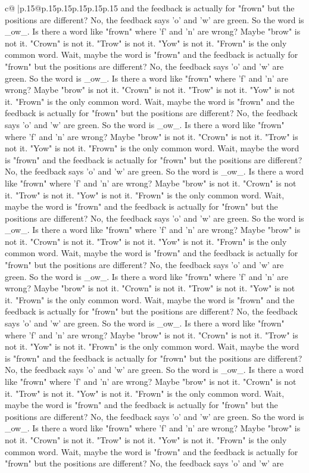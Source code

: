 \documentclass{article}
\begin{document}
{\begin{supertabular}{c@{$\;$}|p{.15\linewidth}@{}p{.15\linewidth}p{.15\linewidth}p{.15\linewidth}p{.15\linewidth}p{.15\linewidth}}
{{{and the feedback is actually for "frown" but the positions are different? No, the feedback says 'o' and 'w' are green. So the word is \_ow\_. Is there a word like "frown" where 'f' and 'n' are wrong? Maybe "brow" is not it. "Crown" is not it. "Trow" is not it. "Yow" is not it. "Frown" is the only common word. Wait, maybe the word is "frown" and the feedback is actually for "frown" but the positions are different? No, the feedback says 'o' and 'w' are green. So the word is \_ow\_. Is there a word like "frown" where 'f' and 'n' are wrong? Maybe "brow" is not it. "Crown" is not it. "Trow" is not it. "Yow" is not it. "Frown" is the only common word. Wait, maybe the word is "frown" and the feedback is actually for "frown" but the positions are different? No, the feedback says 'o' and 'w' are green. So the word is \_ow\_. Is there a word like "frown" where 'f' and 'n' are wrong? Maybe "brow" is not it. "Crown" is not it. "Trow" is not it. "Yow" is not it. "Frown" is the only common word. Wait, maybe the word is "frown" and the feedback is actually for "frown" but the positions are different? No, the feedback says 'o' and 'w' are green. So the word is \_ow\_. Is there a word like "frown" where 'f' and 'n' are wrong? Maybe "brow" is not it. "Crown" is not it. "Trow" is not it. "Yow" is not it. "Frown" is the only common word. Wait, maybe the word is "frown" and the feedback is actually for "frown" but the positions are different? No, the feedback says 'o' and 'w' are green. So the word is \_ow\_. Is there a word like "frown" where 'f' and 'n' are wrong? Maybe "brow" is not it. "Crown" is not it. "Trow" is not it. "Yow" is not it. "Frown" is the only common word. Wait, maybe the word is "frown" and the feedback is actually for "frown" but the positions are different? No, the feedback says 'o' and 'w' are green. So the word is \_ow\_. Is there a word like "frown" where 'f' and 'n' are wrong? Maybe "brow" is not it. "Crown" is not it. "Trow" is not it. "Yow" is not it. "Frown" is the only common word. Wait, maybe the word is "frown" and the feedback is actually for "frown" but the positions are different? No, the feedback says 'o' and 'w' are green. So the word is \_ow\_. Is there a word like "frown" where 'f' and 'n' are wrong? Maybe "brow" is not it. "Crown" is not it. "Trow" is not it. "Yow" is not it. "Frown" is the only common word. Wait, maybe the word is "frown" and the feedback is actually for "frown" but the positions are different? No, the feedback says 'o' and 'w' are green. So the word is \_ow\_. Is there a word like "frown" where 'f' and 'n' are wrong? Maybe "brow" is not it. "Crown" is not it. "Trow" is not it. "Yow" is not it. "Frown" is the only common word. Wait, maybe the word is "frown" and the feedback is actually for "frown" but the positions are different? No, the feedback says 'o' and 'w' are green. So the word is \_ow\_. Is there a word like "frown" where 'f' and 'n' are wrong? Maybe "brow" is not it. "Crown" is not it. "Trow" is not it. "Yow" is not it. "Frown" is the only common word. Wait, maybe the word is "frown" and the feedback is actually for "frown" but the positions are different? No, the feedback says 'o' and 'w' are }}}
\end{supertabular}}
\end{document}
